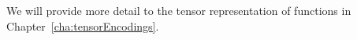 

We will provide more detail to the tensor representation of functions in Chapter~\ref{cha:tensorEncodings}. %





